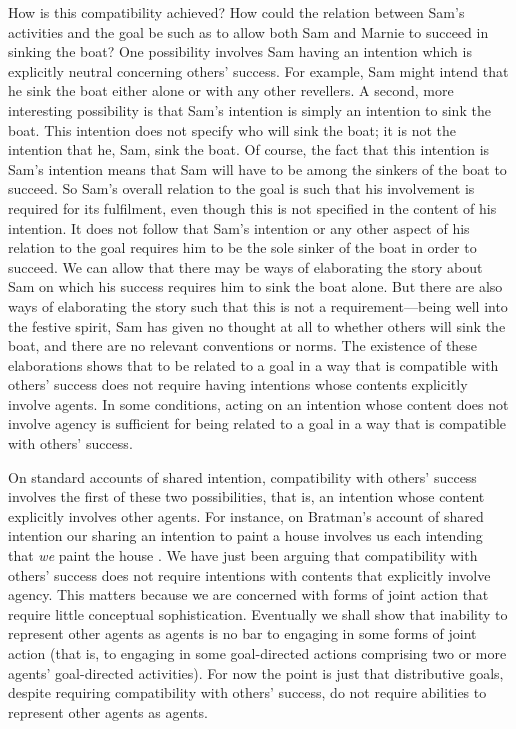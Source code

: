 \documentclass[12pt,a4paper]{extarticle}
\begin{document}
How is this compatibility achieved?  How could the relation between Sam's activities and the goal be such as to allow both Sam and Marnie to succeed in sinking the boat?
One possibility involves Sam having an intention which is explicitly neutral concerning others' success.  
For example, Sam might intend that he sink the boat either alone or with any other revellers.
A second, more interesting possibility is that Sam's intention is simply an intention to sink the boat.
This intention does not specify who will sink the boat; it is not the intention that he, Sam, sink the boat.
Of course, the fact that this intention is Sam's intention means that Sam will have to be among the sinkers of the boat to succeed.  
So Sam's overall relation to the goal is such that his involvement is required for its fulfilment, even though this is not specified in the content of his intention.
It does not follow that Sam's intention or any other aspect of his relation to the goal requires him to be the sole sinker of the boat in order to succeed.
We can allow that there may be ways of elaborating the story about Sam on which his success requires him to sink the boat alone.  
But there are also ways of elaborating the story such that this is not a requirement---being well into the festive spirit, Sam has given no thought at all to whether others will sink the boat, and there are no relevant conventions or norms.
The existence of these elaborations shows that to be related to a goal in a way that is compatible with others' success does not require having intentions whose contents explicitly involve agents.
In some conditions, acting on an intention whose content does not  involve agency is sufficient for being related to a goal in a way that is compatible with others' success.

On standard accounts of shared intention, compatibility with others' success involves the first of these two possibilities, that is, an intention whose content  explicitly involves other agents.  
For instance, on Bratman's account of shared intention our sharing an intention to paint a house involves us each intending that \emph{we} paint the house \citep[p.\ 333]{Bratman:1992mi}.
We have just been arguing that compatibility with  others' success does not require intentions with contents that explicitly involve agency.
This matters because we are concerned with  forms of joint action that require little conceptual sophistication.  
Eventually we shall show that inability to represent other agents as agents is no bar to engaging in some forms of joint action (that is, to engaging in some goal-directed actions comprising two or more agents' goal-directed activities).
For now the point is just that distributive goals, despite requiring compatibility with others' success, do not require abilities to represent other agents as agents.
\end{document}
